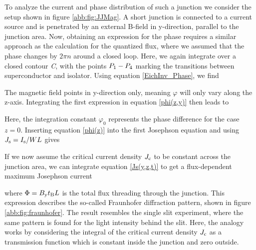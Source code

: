 To analyze the current and phase distribution of such a junction we consider the setup shown in figure \ref{abb:fig:JJMag}. A short junction is connected to a current source and is penetrated by an external B-field in y-direction, parallel to the junction area. Now, obtaining an expression for the phase requires a similar approach as the calculation for the quantized flux, where we assumed that the phase changes by $2\pi n$ around a closed loop. Here, we again integrate over a closed contour \textit{C}, with the points $P_{\rm 1}-P_{\rm 4}$ marking the transitions between superconductor and isolator. Using equation \ref{EichInv_Phase}, we find 


The magnetic field points in y-direction only, meaning $\varphi$ will only vary along the z-axis. Integrating the first expression in equation \ref{phi(z,y)} then leads to


Here, the integration constant $\varphi_0$ represents the phase difference for the case $z=0$. Inserting equation \ref{phi(z)} into the first Josephson equation and using $J_{\rm s} = I_{\rm s}/WL$ gives 


If we now assume the critical current density $J_{\rm c}$ to be constant across the junction area, we can integrate equation \ref{Js(y,z,t)} to get a flux-dependent maximum Josephson current


where $\Phi = B_{\rm y}t_{\rm B}L$ is the total flux threading through the junction. This expression describes the so-called Fraunhofer diffraction pattern, shown in figure \ref{abb:fig:fraunhofer}. The result resembles the single slit experiment, where the same pattern is found for the light intensity behind the slit. Here, the analogy works by considering the integral of the critical current density $J_{\rm c}$ as a transmission function which is constant inside the junction and zero outside. 

